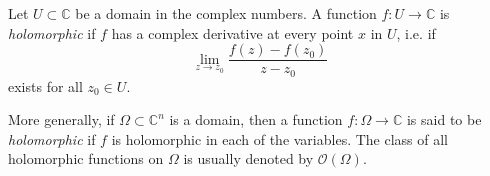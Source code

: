 \documentclass{article}
\begin{document}
Let $U \subset \mathbb{C}$ be a domain in the complex numbers. A
function $f \colon U \longrightarrow \mathbb{C}$ is \emph{holomorphic} if $f$
has a complex derivative at every point $x$ in $U$, i.e. if 
$$\lim_{z\rightarrow z_0} \frac{f(z)-f(z_0)}{z-z_0}$$
exists for all $z_0\in U$.

More generally, if $\Omega\subset \mathbb{C}^n$ is a domain, then a function $f\colon \Omega \to \mathbb{C}$ is said to be \emph{holomorphic} if $f$ is holomorphic in each of the variables. The class of all holomorphic functions on $\Omega$ is usually denoted by $\mathcal{O}(\Omega)$.
\end{document}
